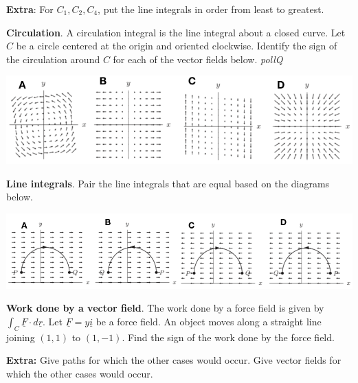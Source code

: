 \documentclass[12pt,letterpaper,noanswers]{exam}
\newcommand{\mb}[1]{\underline{#1}}
\begin{document}
\textbf{Extra}: For $C_1, C_2, C_4$, put the line integrals in order from least to greatest.


\vfill

\noindent\textbf{Circulation}.  A circulation integral is the line integral about a closed curve.  Let $C$ be a circle centered at the origin and oriented clockwise.  Identify the sign of the circulation around $C$ for each of the vector fields below.  \emph{pollQ}

\includegraphics[width=\linewidth]{img/C25p4-18.png}
\vfill



\noindent\textbf{Line integrals}.  Pair the line integrals that are equal based on the diagrams below.

\includegraphics[width=\linewidth]{img/C25p5-18.png}

\vfill

\noindent\textbf{Work done by a vector field}.  The work done by a force field is given by $\int_C \mb F\cdot d\mb r$.  Let $\mb F = y\mb i$ be a force field.  An object moves along a straight line joining $(1,1)$ to $(1,-1)$.  Find the sign of the work done by the force field. %


\textbf{Extra:} Give paths for which the other cases would occur.  Give vector fields for which the other cases would occur.

\vfill

\eject

\end{document}
